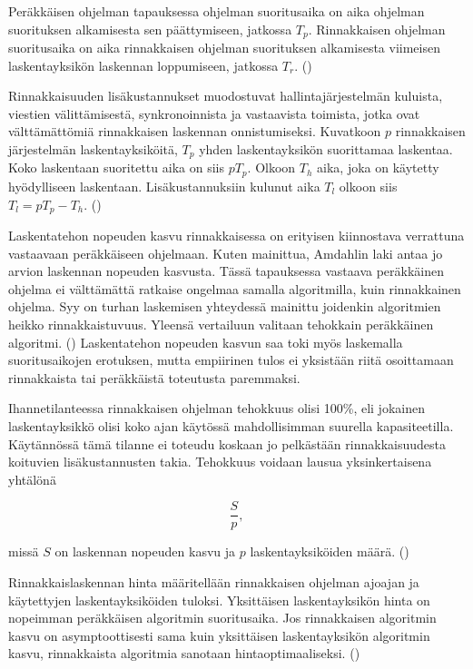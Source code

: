 Peräkkäisen ohjelman tapauksessa ohjelman suoritusaika on aika ohjelman
suorituksen alkamisesta sen päättymiseen, jatkossa $T_p$. Rinnakkaisen
ohjelman suoritusaika on aika rinnakkaisen ohjelman suorituksen alkamisesta
viimeisen laskentayksikön laskennan loppumiseen, jatkossa $T_r$. (\cite{intro})

Rinnakkaisuuden lisäkustannukset muodostuvat hallintajärjestelmän kuluista,
viestien välittämisestä, synkronoinnista ja vastaavista toimista, jotka ovat
välttämättömiä rinnakkaisen laskennan onnistumiseksi. Kuvatkoon $p$
rinnakkaisen järjestelmän laskentayksiköitä, $T_p$ yhden laskentayksikön
suorittamaa laskentaa. Koko laskentaan suoritettu aika on siis $pT_p$. Olkoon
$T_h$ aika, joka on käytetty hyödylliseen laskentaan. Lisäkustannuksiin kulunut
aika $T_l$ olkoon siis $T_l = pT_p - T_h$. (\cite{intro})

Laskentatehon nopeuden kasvu rinnakkaisessa on erityisen kiinnostava verrattuna
vastaavaan peräkkäiseen ohjelmaan. Kuten mainittua, Amdahlin laki antaa jo
arvion laskennan nopeuden kasvusta. Tässä tapauksessa vastaava peräkkäinen ohjelma ei
välttämättä ratkaise ongelmaa samalla algoritmilla, kuin rinnakkainen ohjelma. Syy
on turhan laskemisen yhteydessä mainittu joidenkin algoritmien heikko rinnakkaistuvuus.
Yleensä vertailuun valitaan tehokkain peräkkäinen algoritmi. (\cite{intro})
Laskentatehon nopeuden kasvun saa toki myös laskemalla suoritusaikojen erotuksen,
mutta empiirinen tulos ei yksistään riitä osoittamaan rinnakkaista tai peräkkäistä
toteutusta paremmaksi.

Ihannetilanteessa rinnakkaisen ohjelman tehokkuus olisi 100\%, eli jokainen
laskentayksikkö olisi koko ajan käytössä mahdollisimman suurella
kapasiteetilla. Käytännössä tämä tilanne ei toteudu koskaan jo pelkästään
rinnakkaisuudesta koituvien lisäkustannusten takia. Tehokkuus voidaan lausua
yksinkertaisena yhtälönä

\begin{center}
\begin{equation}\frac{S}{p},\end{equation}
\end{center}

missä $S$ on laskennan nopeuden kasvu ja $p$ laskentayksiköiden määrä. 
(\cite{intro})

Rinnakkaislaskennan hinta määritellään rinnakkaisen ohjelman ajoajan ja
käytettyjen laskentayksiköiden tuloksi. Yksittäisen laskentayksikön hinta on
nopeimman peräkkäisen algoritmin suoritusaika. Jos rinnakkaisen algoritmin
kasvu on asymptoottisesti sama kuin yksittäisen laskentayksikön algoritmin kasvu,
rinnakkaista algoritmia sanotaan hintaoptimaaliseksi. (\cite{intro})

